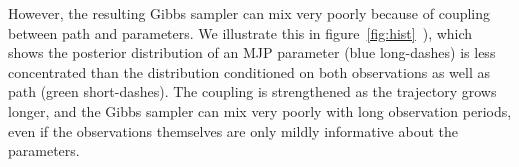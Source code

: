   However, the resulting Gibbs sampler can mix very poorly because of coupling between path and parameters.
  We illustrate this in figure~\ref{fig:hist}~\citep[inspired by][]{papaspiliopoulos2007general}), which shows the posterior distribution of an MJP parameter (blue long-dashes) is less concentrated than the distribution conditioned on both observations as well as path (green short-dashes). 
The coupling is strengthened as the trajectory grows longer, and the Gibbs sampler can mix very poorly with long observation periods, even if the observations themselves are only mildly informative about the parameters.


